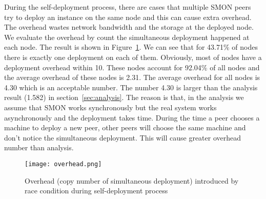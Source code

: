 During the self-deployment process, there are cases that
multiple SMON peers try to deploy an instance on the same
node and this can cause extra overhead. The overhead wastes
network bandwidth and the storage at the deployed node. We
evaluate the overhead by count the simultaneous deployment
happened at each node. The result is shown in
Figure~\ref{fig:overhead}. We can see that for 43.71\% of
nodes there is exactly one deployment on each of them.
Obviously, most of nodes have a deployment overhead within
10. These nodes account for 92.04\% of all nodes and the
average overhead of these nodes is 2.31. The average
overhead for all nodes is 4.30 which is an acceptable
number. The number 4.30 is larger than the analysis result
(1.582) in section~\ref{sec:analysis}. The reason is that,
in the analysis we assume that SMON works synchronously but
the real system works asynchronously and the deployment
takes time. During the time a peer chooses a machine to
deploy a new peer, other peers will choose the same machine
and don't notice the simultaneous deployment. This will
cause greater overhead number than analysis.

\begin{figure}
\centering
\texttt{[image: overhead.png]}
\caption{Overhead (copy number of simultaneous deployment)
introduced by race condition during
self-deployment process}
\label{fig:overhead}
\end{figure}


